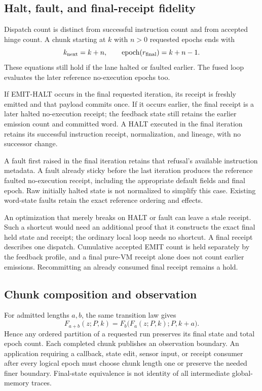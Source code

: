\subsection{Halt, fault, and final-receipt fidelity}

Dispatch count is distinct from successful instruction count and from
accepted hinge count. A chunk starting at $k$ with $n>0$ requested epochs
ends with
\begin{equation}
 k_{\rm next}=k+n,\qquad
 \operatorname{epoch}(r_{\rm final})=k+n-1.
 \label{eq:r17-final-epoch}
\end{equation}
These equations still hold if the lane halted or faulted earlier. The
fused loop evaluates the later reference no-execution epochs too.

If EMIT-HALT occurs in the final requested iteration, its receipt is freshly
emitted and that payload commits once. If it occurs earlier, the final
receipt is a later halted no-execution receipt; the feedback state still
retains the earlier emission count and committed word. A HALT executed
in the final iteration retains its successful instruction receipt,
normalization, and lineage, with no successor change.

A fault first raised in the final iteration retains that refusal's
available instruction metadata. A fault already sticky before the last
iteration produces the reference faulted no-execution receipt, including
the appropriate default fields and final epoch. Raw initially halted
state is not normalized to simplify this case. Existing word-state
faults retain the exact reference ordering and effects.

An optimization that merely breaks on HALT or fault can leave a stale
receipt. Such a shortcut would need an additional proof that it constructs
the exact final held state and receipt; the ordinary local loop needs
no shortcut. A final receipt describes one dispatch. Cumulative accepted
EMIT count is held separately by the feedback profile, and a final pure-VM
receipt alone does not count earlier emissions. Recommitting an already
consumed final receipt remains a hold.

\subsection{Chunk composition and observation}

For admitted lengths $a,b$, the same transition law gives
\begin{equation}
 F_{a+b}(z;P,k)=F_b\bigl(F_a(z;P,k);P,k+a\bigr).
 \label{eq:r17-chunk-associativity}
\end{equation}
Hence any ordered partition of a requested run preserves its final
state and total epoch count. Each completed chunk publishes an observation
boundary. An application requiring a callback, state edit, sensor input,
or receipt consumer after every logical epoch must choose chunk length
one or preserve the needed finer boundary. Final-state equivalence is
not identity of all intermediate global-memory traces.

